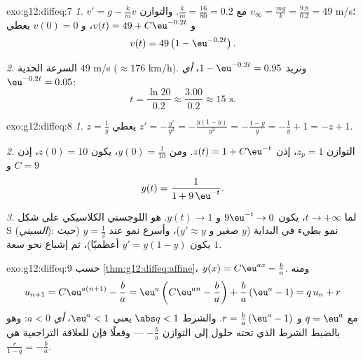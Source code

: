 \begin{solution}{exo:g12:diffeq:7}
\emph{1.} $v' = g - \frac{k}{m} v$ مع $\frac km = \frac{16}{80} = 0.2$.
والتوازن $v_\infty = \frac{mg}{k} = \frac{9.8}{0.2} = 49$ m/s؛
و $v(t) = 49 + C\eu^{-0.2t}$، و $v(0) = 0$ يعطي
\[
v(t) = 49\left(1 - \eu^{-0.2 t}\right).
\]

\emph{2.} السرعة الحدية $49$ m/s ($\approx 176$ km/h). ونريد
$1 - \eu^{-0.2t} = 0.95$، \emph{أي} $\eu^{-0.2t} = 0.05$:
\[
t = \frac{\ln 20}{0.2} \approx \frac{3.00}{0.2} \approx 15 \text{ s}.
\]
\end{solution}

\begin{solution}{exo:g12:diffeq:8}
\emph{1.} $z = \frac1y$ يعطي $z' = -\frac{y'}{y^2}
= -\frac{y(1-y)}{y^2} = -\frac{1-y}{y} = -\frac1y + 1 = -z + 1$.

\emph{2.} التوازن $z_p = 1$، إذن $z(t) = 1 + C\eu^{-t}$. ومن
$y(0) = \frac{1}{10}$، يكون $z(0) = 10$، إذن $C = 9$ و
\[
y(t) = \frac{1}{1 + 9\,\eu^{-t}} .
\]

\emph{3.} لما $t \to +\infty$، يكون $9\eu^{-t} \to 0$ و $y(t) \to 1$. 
هو  اللوجستي الكلاسيكي على شكل S (\emph{السيني}): نمو بطيء
في البداية ($y$ صغير و $y' \approx y$)، وأسرع نمو عند $y = \frac12$
(حيث يكون $y' = y(1-y)$ أعظميًا)، ثم إشباع نحو سعة
 $1$.
\end{solution}

\begin{solution}{exo:g12:diffeq:9}
حسب \cref{thm:g12:diffeq:affine}، $y(x) = C\eu^{ax} - \frac ba$. ومنه
\[
u_{n+1} = C\eu^{a(n+1)} - \frac ba
= \eu^{a}\left(C\eu^{an} - \frac ba\right) + \frac ba\left(\eu^a - 1\right)
= q\,u_n + r
\]
مع $q = \eu^{a}$ و $r = \frac{b}{a}\left(\eu^{a} - 1\right)$.
والشرط $\abs q < 1$ يعني $\eu^a < 1$، \emph{أي} $a < 0$: وهو بالضبط
الشرط الذي  تحته حلول 
إلى التوازن $-\frac ba$ --- وفعلًا فإن 
للعلاقة التراجعية هي $\frac{r}{1 - q} = -\frac{b}{a}$.
\end{solution}

